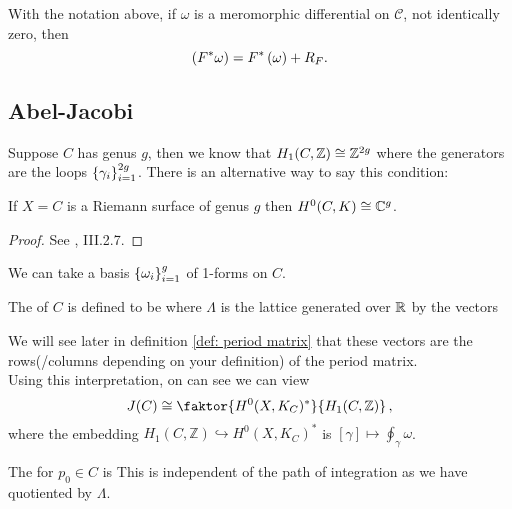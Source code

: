 \documentclass{article}
\begin{document}
\begin{lemma}\label{lemma: pullback of divisor of differential} 
	With the notation above, if $\omega$ is a
	meromorphic differential on $\mathcal{C}$, not identically zero,
	then
	\begin{equation}
	\left(F\sp\ast\omega \right) =F\sp\ast\left(\omega \right)+R_F.
	\end{equation}
\end{lemma}
\subsection{Abel-Jacobi}
Suppose $C$ has genus $g$, then we know that $H_1(C,\mathbb{Z}) \cong \mathbb{Z}^{2g}$ where the generators are the loops $\left\{ \gamma_i \right\}_{i=1}^{2g}$. There is an alternative way to say this condition:

\begin{prop}
	If $X=C$ is a Riemann surface of genus $g$ then $H^0(C,K)\cong \mathbb{C}^g$. 
\end{prop}
\begin{proof}
	See \cite{Farkas1992}, III.2.7.
\end{proof}
\begin{corollary}
	We can take a basis $\left\{ \omega_i \right\}_{i=1}^g$ of 1-forms on $C$. 
\end{corollary}
\begin{definition}
	The  of $C$ is defined to be 
	where $\Lambda$ is the lattice generated over $\mathbb{R}$ by the vectors 
\end{definition}

\begin{remark}
	We will see later in definition \ref{def: period matrix} that these vectors are the rows(/columns depending on your definition) of the period matrix. \\
	Using this interpretation, on can see we can view 
	\[
	J(C) \cong \faktor{H^0(X, K_C)^\ast}{H_1(C, \mathbb{Z})} \, ,
	\]
	where the embedding $H_1(C, \mathbb{Z}) \hookrightarrow H^0(X, K_C)^\ast$ is $[\gamma] \mapsto \oint_\gamma \omega$. 
	\end{remark}

\begin{definition}
	The  for $p_0 \in C$ is 
	This is independent of the path of integration as we have quotiented by $\Lambda$. 
\end{definition}
\end{document}
